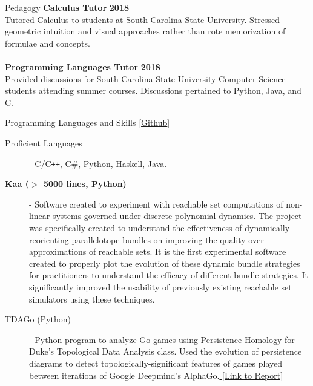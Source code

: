 \documentclass{resume} %
\begin{document}
\begin{rSection}{Pedagogy}
{\bf Calculus Tutor} \hfill {\bf 2018} \\
Tutored Calculus to students at South Carolina State University. Stressed geometric intuition and visual approaches rather than rote memorization of formulae and concepts. \\
\\
{\bf Programming Languages Tutor} \hfill {\bf 2018} \\
Provided discussions for South Carolina State University Computer Science students attending summer courses. Discussions pertained to Python, Java, and C. \\
\end{rSection}


\begin{rSection}{Programming Languages and Skills [\href{https://github.com/ekim1919}{Github}]}
  \begin{description}
    \item[Proficient Languages] - C/C\texttt{++}, C\#, Python, Haskell, Java.
    \item[\bf Kaa ($>$ 5000 lines, Python)] - Software created to experiment with reachable set computations of non-linear systems governed under discrete polynomial dynamics. The project was specifically created to understand the effectiveness of dynamically-reorienting parallelotope bundles on improving the quality over-approximations of reachable sets. It is the first experimental software created to properly plot the evolution of these dynamic bundle strategies for practitioners to understand the efficacy of different bundle strategies. It significantly improved the usability of previously existing reachable set simulators using these techniques.
    \item[TDAGo (Python)] - Python program to analyze Go games using Persistence Homology for Duke's Topological Data Analysis class. Used the evolution of persistence diagrams to detect topologically-significant features of games played between iterations of Google Deepmind's AlphaGo.\href{https://github.com/ekim1919/TDAGo/blob/master/paper/final.pdf}{ [Link to Report] }
  \end{description}
\end{rSection}

\end{document}
